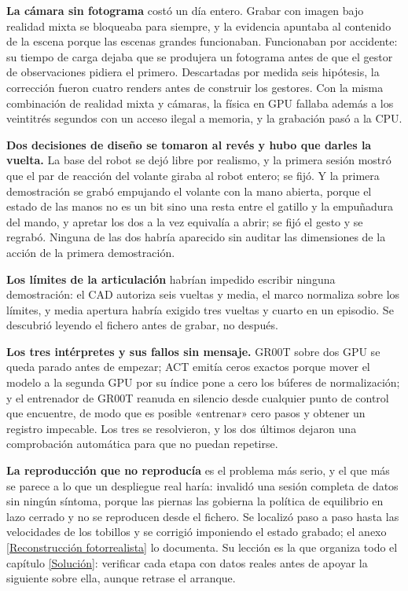 \textbf{La cámara sin fotograma} costó un día entero. Grabar con imagen bajo realidad mixta se
bloqueaba para siempre, y la evidencia apuntaba al contenido de la escena porque las escenas
grandes funcionaban. Funcionaban por accidente: su tiempo de carga dejaba que se produjera un
fotograma antes de que el gestor de observaciones pidiera el primero. Descartadas por medida
seis hipótesis, la corrección fueron cuatro renders antes de construir los gestores. Con la misma
combinación de realidad mixta y cámaras, la física en GPU fallaba además a los veintitrés segundos
con un acceso ilegal a memoria, y la grabación pasó a la CPU.

\textbf{Dos decisiones de diseño se tomaron al revés y hubo que darles la vuelta.} La base del
robot se dejó libre por realismo, y la primera sesión mostró que el par de reacción del volante
giraba al robot entero; se fijó. Y la primera demostración se grabó empujando el volante con la
mano abierta, porque el estado de las manos no es un bit sino una resta entre el gatillo y la
empuñadura del mando, y apretar los dos a la vez equivalía a abrir; se fijó el gesto y se
regrabó. Ninguna de las dos habría aparecido sin auditar las dimensiones de la acción de la
primera demostración.

\textbf{Los límites de la articulación} habrían impedido escribir ninguna demostración: el CAD
autoriza seis vueltas y media, el marco normaliza sobre los límites, y media apertura habría
exigido tres vueltas y cuarto en un episodio. Se descubrió leyendo el fichero antes de grabar, no
después.

\textbf{Los tres intérpretes y sus fallos sin mensaje.} GR00T sobre dos GPU se queda parado antes
de empezar; ACT emitía ceros exactos porque mover el modelo a la segunda GPU por su índice pone a
cero los búferes de normalización; y el entrenador de GR00T reanuda en silencio desde cualquier
punto de control que encuentre, de modo que es posible «entrenar» cero pasos y obtener un
registro impecable. Los tres se resolvieron, y los dos últimos dejaron una comprobación automática
para que no puedan repetirse.

\textbf{La reproducción que no reproducía} es el problema más serio, y el que más se parece a lo
que un despliegue real haría: invalidó una sesión completa de datos sin ningún síntoma, porque las
piernas las gobierna la política de equilibrio en lazo cerrado y no se reproducen desde el
fichero. Se localizó paso a paso hasta las velocidades de los tobillos y se corrigió imponiendo el
estado grabado; el anexo \ref{Reconstrucción fotorrealista} lo documenta. Su lección es la que
organiza todo el capítulo \ref{Solución}: verificar cada etapa con datos reales antes de
apoyar la siguiente sobre ella, aunque retrase el arranque.


